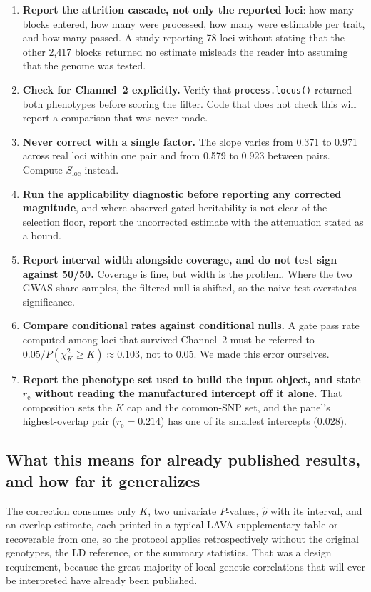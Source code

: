 \documentclass[12pt,a4paper]{article}
\newcommand{\rh}{\hat{\rho}}
\newcommand{\Slocus}{S_{\mathrm{loc}}}
\newcommand{\re}{r_{\mathrm{e}}}
\begin{document}
\begin{enumerate}
\item \textbf{Report the attrition cascade, not only the reported loci}: how many blocks
  entered, how many were processed, how many were estimable per trait, and how many passed.
  A study reporting 78 loci without stating that the other 2,417 blocks returned no
  estimate misleads the reader into assuming that the genome was tested.
\item \textbf{Check for Channel~2 explicitly.} Verify that \texttt{process.locus()}
  returned both phenotypes before scoring the filter. Code that does not check this will
  report a comparison that was never made.
\item \textbf{Never correct with a single factor.} The slope varies from 0.371 to 0.971
  across real loci within one pair and from 0.579 to 0.923 between pairs. Compute $\Slocus$
  instead.
\item \textbf{Run the applicability diagnostic before reporting any corrected magnitude},
  and where observed gated heritability is not clear of the selection floor, report the
  uncorrected estimate with the attenuation stated as a bound.
\item \textbf{Report interval width alongside coverage, and do not test sign against
  50/50.} Coverage is fine, but width is the problem. Where the two GWAS share samples,
  the filtered null is shifted, so the naive test overstates significance.
\item \textbf{Compare conditional rates against conditional nulls.} A gate pass rate
  computed among loci that survived Channel~2 must be referred to
  $0.05/P(\chi^2_K\ge K)\approx0.103$, not to 0.05. We made this error ourselves.
\item \textbf{Report the phenotype set used to build the input object, and state $\re$
  without reading the manufactured intercept off it alone.} That composition sets the $K$
  cap and the common-SNP set, and the panel's highest-overlap pair ($\re=0.214$) has one of
  its smallest intercepts (0.028).
\end{enumerate}
\subsection{What this means for already published results, and how far it generalizes}\label{sec:published}

The correction consumes only $K$, two univariate $P$-values, $\rh$ with its interval, and
an overlap estimate, each printed in a typical LAVA supplementary table or recoverable
from one, so the protocol applies retrospectively without the original genotypes, the LD
reference, or the summary statistics. That was a design requirement, because the great
majority of local genetic correlations that will ever be interpreted have already been
published.
\end{document}

